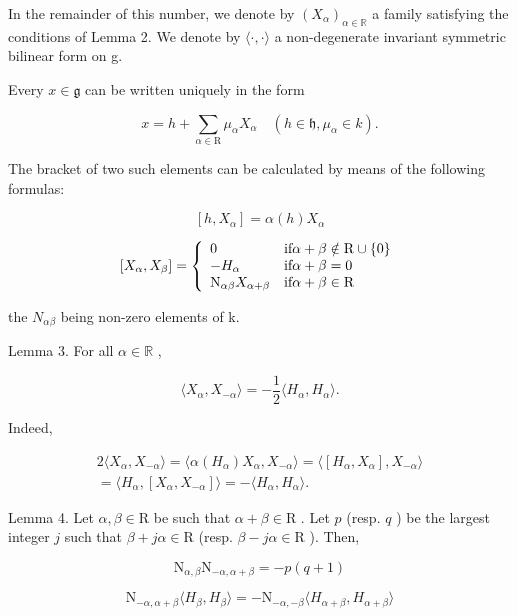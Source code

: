 In the remainder of this number, we denote by \((X_{\alpha})_{\alpha\in\mathbb{R}}\) a family satisfying the conditions of Lemma 2. We denote by \(\langle\cdot,\cdot\rangle\) a non-degenerate invariant symmetric bilinear form on g.

Every \(x \in \mathfrak{g}\) can be written uniquely in the form

\[
x = h + \sum_ {\alpha \in \mathrm{R}} \mu_ {\alpha} X _ {\alpha} \quad (h \in \mathfrak {h}, \mu_ {\alpha} \in k).
\]

The bracket of two such elements can be calculated by means of the following formulas:

\[
[ h, X _ {\alpha} ] = \alpha (h) X _ {\alpha}
\]

\[
[ X _ {\alpha}, X _ {\beta} ] = \left\{ \begin{array}{l l} 0 & \text {if} \alpha + \beta \notin \mathrm{R} \cup \{0 \} \\ - H _ {\alpha} & \text {if} \alpha + \beta = 0 \\ \mathrm{N} _ {\alpha \beta} X _ {\alpha + \beta} & \text {if} \alpha + \beta \in \mathrm{R} \end{array} \right.
\]

the \(N_{\alpha\beta}\) being non-zero elements of k.

Lemma 3. For all \(\alpha \in \mathbb{R}\) ,

\[
\langle X _ {\alpha}, X _ {- \alpha} \rangle = - \frac {1}{2} \langle H _ {\alpha}, H _ {\alpha} \rangle .
\]

Indeed,

\[
\begin{array}{c} 2 \langle X _ {\alpha}, X _ {- \alpha} \rangle = \langle \alpha (H _ {\alpha}) X _ {\alpha}, X _ {- \alpha} \rangle = \langle [ H _ {\alpha}, X _ {\alpha} ], X _ {- \alpha} \rangle \\ = \langle H _ {\alpha}, [ X _ {\alpha}, X _ {- \alpha} ] \rangle = - \langle H _ {\alpha}, H _ {\alpha} \rangle . \end{array}
\]

Lemma 4. Let \(\alpha, \beta \in \mathrm{R}\) be such that \(\alpha + \beta \in \mathrm{R}\) . Let \(p\) (resp. \(q\) ) be the largest integer \(j\) such that \(\beta + j\alpha \in \mathrm{R}\) (resp. \(\beta - j\alpha \in \mathrm{R}\) ). Then,

\[
\mathrm{N} _ {\alpha , \beta} \mathrm{N} _ {- \alpha , \alpha + \beta} = - p (q + 1)\tag{3}
\]

\[
\mathrm{N} _ {- \alpha , \alpha + \beta} \langle H _ {\beta}, H _ {\beta} \rangle = - \mathrm{N} _ {- \alpha , - \beta} \langle H _ {\alpha + \beta}, H _ {\alpha + \beta} \rangle\tag{4}
\]

